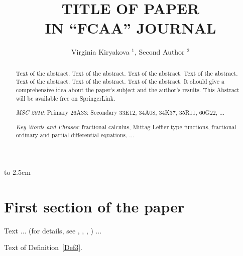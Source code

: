 \documentclass[twoside,reqno,11pt]{fcaa}
\title[TITLE OF PAPER \dots]{TITLE OF PAPER \\ [4pt] IN ``FCAA'' JOURNAL}
\author[V. Kiryakova, S. Author]{Virginia Kiryakova $^1$, Second Author $^2$}
\begin{document}
 \vbox to 2.5cm { \vfill }


 \bigskip \medskip

 \begin{abstract}

Text of the abstract. Text of the abstract. Text of the abstract.
Text of the abstract. Text of the abstract. Text of the abstract.
Text of the abstract. It should give a comprehensive idea about the
paper's subject and the author's results. This Abstract will be
available free on SpringerLink.

 \medskip

{\it MSC 2010\/}: Primary 26A33: Secondary 33E12, 34A08, 34K37,
35R11, 60G22, ...

 \smallskip

{\it Key Words and Phrases}: fractional calculus, Mittag-Leffler
type functions, fractional ordinary and partial differential
equations, ...

 \end{abstract}

 \maketitle

 \vspace*{-16pt}



 \section{First section of the paper}\label{sec:1}

\setcounter{section}{1}
\setcounter{equation}{0}\setcounter{theorem}{0}


Text ... (for details, see \cite{GasRah}, \cite{Rosbl}, \cite{Kir},
\cite{Moak}) ...

 \begin{definition}\label{Def3}
Text of Definition~\ref{Def3}.
 \end{definition}
\end{document}
